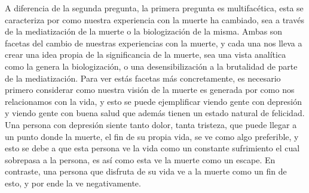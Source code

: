 \documentclass{homework}
\begin{document}
A diferencia de la segunda pregunta, la primera pregunta es multifacética, esta se caracteriza por como nuestra experiencia con la muerte ha cambiado, sea a través de la mediatización de la muerte o la biologización de la misma. Ambas son facetas del cambio de nuestras experiencias con la muerte, y cada una nos lleva a crear una idea propia de la significancia de la muerte, sea una vista analítica como la genera la biologización, o una desensibilización a la brutalidad de parte de la mediatización. Para ver estás facetas más concretamente, es necesario primero considerar como nuestra visión de la muerte es generada por como nos relacionamos con la vida, y esto se puede ejemplificar viendo gente con depresión y viendo gente con buena salud que además tienen un estado natural de felicidad. Una persona con depresión siente tanto dolor, tanta tristeza, que puede llegar a un punto donde la muerte, el fin de su propia vida, se ve como algo preferible, y esto se debe a que esta persona ve la vida como un constante sufrimiento el cual sobrepasa a la persona, es así como esta ve la muerte como un escape. En contraste, una persona que disfruta de su vida ve a la muerte como un fin de esto, y por ende la ve negativamente.
\end{document}
